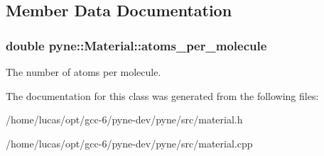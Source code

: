 \subsection{Member Data Documentation}
\subsubsection[{\texorpdfstring{atoms\+\_\+per\+\_\+molecule}{atoms_per_molecule}}]{\setlength{\rightskip}{0pt plus 5cm}double pyne\+::\+Material\+::atoms\+\_\+per\+\_\+molecule}\hypertarget{classpyne_1_1_material_a7ddff1aaebc94bcda22d3422c093a756}{}\label{classpyne_1_1_material_a7ddff1aaebc94bcda22d3422c093a756}
The number of atoms per molecule. 

The documentation for this class was generated from the following files\+:\begin{DoxyCompactItemize}
\item 
/home/lucas/opt/gcc-\/6/pyne-\/dev/pyne/src/material.\+h\item 
/home/lucas/opt/gcc-\/6/pyne-\/dev/pyne/src/material.\+cpp\end{DoxyCompactItemize}
